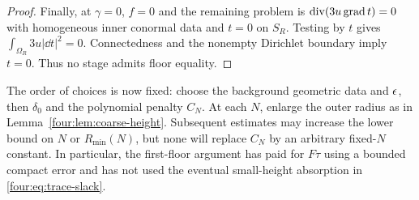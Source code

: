 \begin{proof}
Finally, at $\gamma=0$, $f=0$ and the remaining problem is
$\operatorname{div}(3u\operatorname{grad} t)=0$ with homogeneous inner conormal data and $t=0$
on $S_R$.  Testing by $t$ gives $\int_{\Omega_R}3u|\dd t|^2=0$.
Connectedness and the nonempty Dirichlet boundary imply $t=0$.
Thus no stage admits floor equality.
\end{proof}

The order of choices is now fixed: choose the background geometric
data and $\epsilon$, then $\delta_0$ and the polynomial penalty $C_N$.
At each $N$, enlarge the outer radius as in
Lemma~\ref{four:lem:coarse-height}.  Subsequent estimates may increase the
lower bound on $N$ or $R_{\min}(N)$, but none will replace $C_N$ by an
arbitrary fixed-$N$ constant.  In particular, the first-floor argument
has paid for $F\tau$ using a bounded compact error and has not used the
eventual small-height absorption in \eqref{four:eq:trace-slack}.
